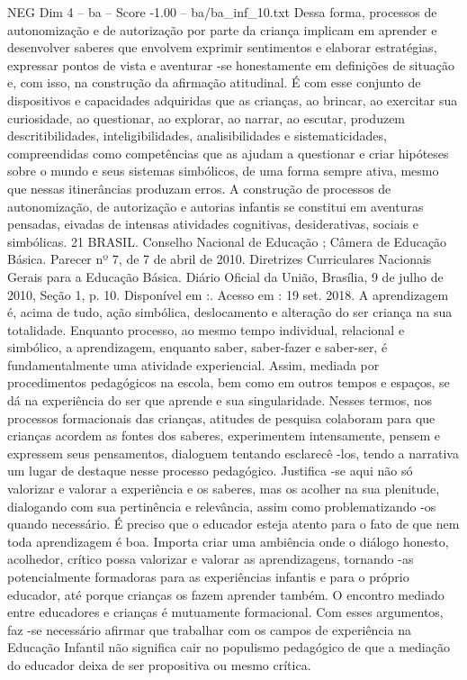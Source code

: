 \begin{textsample}{NEG Dim 4 – ba – Score -1.00 – ba/ba\_inf\_10.txt}
Dessa forma, processos de autonomização e de autorização por parte da criança implicam em aprender e desenvolver saberes que envolvem exprimir sentimentos e elaborar estratégias, expressar pontos de vista e aventurar -se honestamente em definições de situação e, com isso, na construção da afirmação atitudinal.
É com esse conjunto de dispositivos e capacidades adquiridas que as crianças, ao brincar, ao exercitar sua curiosidade, ao questionar, ao explorar, ao narrar, ao escutar, produzem descritibilidades, inteligibilidades, analisibilidades e sistematicidades, compreendidas como competências que as ajudam a questionar e criar hipóteses sobre o mundo e seus sistemas simbólicos, de uma forma sempre ativa, mesmo que nessas itinerâncias produzam erros.
A construção de processos de autonomização, de autorização e autorias infantis se constitui em aventuras pensadas, eivadas de intensas atividades cognitivas, desiderativas, sociais e simbólicas. 21 BRASIL.
Conselho Nacional de Educação ; Câmera de Educação Básica.
Parecer nº 7, de 7 de abril de 2010.
Diretrizes Curriculares Nacionais Gerais para a Educação Básica.
Diário Oficial da União, Brasília, 9 de julho de 2010, Seção 1, p. 10.
Disponível em :.
Acesso em : 19 set. 2018.
A aprendizagem é, acima de tudo, ação simbólica, deslocamento e alteração do ser criança na sua totalidade.
Enquanto processo, ao mesmo tempo individual, relacional e simbólico, a aprendizagem, enquanto saber, saber-fazer e saber-ser, é fundamentalmente uma atividade experiencial.
Assim, mediada por procedimentos pedagógicos na escola, bem como em outros tempos e espaços, se dá na experiência do ser que aprende e sua singularidade.
Nesses termos, nos processos formacionais das crianças, atitudes de pesquisa colaboram para que crianças acordem as fontes dos saberes, experimentem intensamente, pensem e expressem seus pensamentos, dialoguem tentando esclarecê -los, tendo a narrativa um lugar de destaque nesse processo pedagógico.
Justifica -se aqui não só valorizar e valorar a experiência e os saberes, mas os acolher na sua plenitude, dialogando com sua pertinência e relevância, assim como problematizando -os quando necessário.
É preciso que o educador esteja atento para o fato de que nem toda aprendizagem é boa.
Importa criar uma ambiência onde o diálogo honesto, acolhedor, crítico possa valorizar e valorar as aprendizagens, tornando -as potencialmente formadoras para as experiências infantis e para o próprio educador, até porque crianças os fazem aprender também.
O encontro mediado entre educadores e crianças é mutuamente formacional.
Com esses argumentos, faz -se necessário afirmar que trabalhar com os campos de experiência na Educação Infantil não significa cair no populismo pedagógico de que a mediação do educador deixa de ser propositiva ou mesmo crítica.

\end{textsample}
